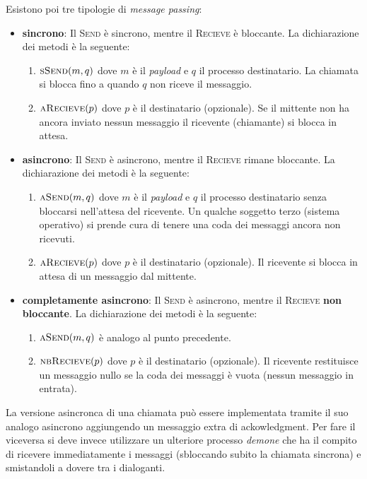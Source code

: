 \documentclass{article}
\begin{document}
Esistono poi tre tipologie di \emph{message passing}:
\begin{itemize}
  \item \textbf{sincrono}: Il \textsc{Send} \`e sincrono, mentre il \textsc{Recieve}
    \`e bloccante. La dichiarazione dei metodi \`e la seguente:
    \begin{enumerate}
      \item $\textsc{sSend}(m, q)$ dove $m$ \`e il \emph{payload} e $q$ il
        processo destinatario. La chiamata si blocca fino a quando $q$ non
        riceve il messaggio.
      \item $\textsc{aRecieve}(p)$ dove $p$ \`e il destinatario (opzionale).
        Se il mittente non ha ancora inviato nessun messaggio il ricevente
        (chiamante) si blocca in attesa.
    \end{enumerate}
  \item \textbf{asincrono}: Il \textsc{Send} \`e asincrono, mentre il \textsc{Recieve}
    rimane bloccante. La dichiarazione dei metodi \`e la seguente:
    \begin{enumerate}
      \item $\textsc{aSend}(m, q)$ dove $m$ \`e il \emph{payload} e $q$ il
        processo destinatario senza bloccarsi nell'attesa del ricevente.
        Un qualche soggetto terzo (sistema operativo) si prende cura di tenere
        una coda dei messaggi ancora non ricevuti.
      \item $\textsc{aRecieve}(p)$ dove $p$ \`e il destinatario (opzionale).
        Il ricevente si blocca in attesa di un messaggio dal mittente.
    \end{enumerate}
  \item \textbf{completamente asincrono}: Il \textsc{Send} \`e asincrono,
    mentre il \textsc{Recieve} \textbf{non bloccante}. La dichiarazione dei
    metodi \`e la seguente:
    \begin{enumerate}
      \item $\textsc{aSend}(m, q)$ \`e analogo al punto precedente.
      \item $\textsc{nbRecieve}(p)$ dove $p$ \`e il destinatario (opzionale).
        Il ricevente restituisce un messaggio nullo se la coda dei messaggi \`e
        vuota (nessun messaggio in entrata).
    \end{enumerate}
\end{itemize}

La versione asincronca di una chiamata pu\`o essere implementata tramite il suo
analogo asincrono aggiungendo un messaggio extra di ackowledgment. Per fare il
viceversa si deve invece utilizzare un ulteriore processo \emph{demone} che ha
il compito di ricevere immediatamente i messaggi (sbloccando subito la chiamata
sincrona) e smistandoli a dovere tra i dialoganti.
\end{document}
